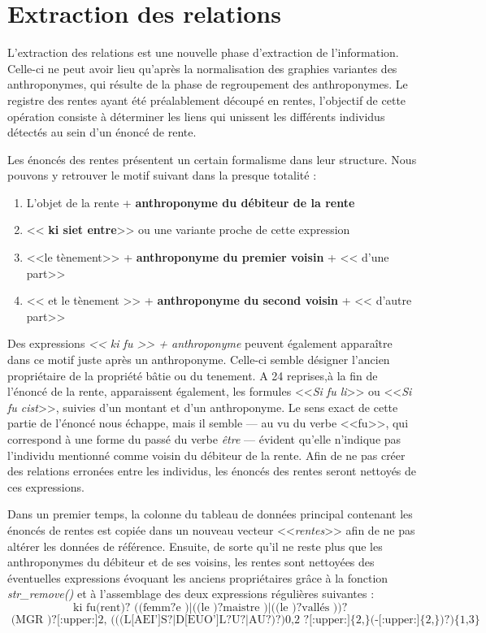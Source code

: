 \section{Extraction des relations}
L'extraction des relations est une nouvelle phase d'extraction de l'information. Celle-ci ne peut avoir lieu qu'après la normalisation des graphies variantes des anthroponymes, qui résulte de la phase de regroupement des anthroponymes.
Le registre des rentes ayant été préalablement découpé en rentes, l'objectif de cette opération consiste à déterminer les liens qui unissent les différents individus détectés au sein d'un énoncé de rente.

Les énoncés des rentes présentent un certain formalisme dans leur structure. Nous pouvons y retrouver le motif suivant dans la presque totalité : 
\begin{enumerate}
\item L'objet de la rente +  \textbf{anthroponyme du débiteur de la rente}
\item << \textbf{ki siet entre}>> ou une variante proche de cette expression
\item <<le tènement>> +  \textbf{anthroponyme du premier voisin } + << d'une part>> 
\item << et le tènement >> + \textbf{anthroponyme du second voisin} + << d'autre part>>
\end{enumerate}
Des expressions \textit{<< ki fu >> + anthroponyme} peuvent également apparaître dans ce motif juste après un anthroponyme. Celle-ci semble désigner l'ancien propriétaire de la propriété bâtie ou du tenement. A 24 reprises,à la fin de l'énoncé de la rente, apparaissent également,  les formules <<\textit{Si fu li}>> ou <<\textit{Si fu cist}>>, suivies d'un montant et d'un anthroponyme. Le sens exact de cette partie de l'énoncé nous échappe, mais il semble --- au vu du verbe <<fu>>,  qui correspond à une forme du passé du verbe \textit{être} --- évident qu'elle n'indique pas l'individu mentionné comme voisin du débiteur de la rente. Afin de ne pas créer des relations erronées entre les individus, les énoncés des rentes seront nettoyés de ces expressions.

Dans un premier temps, la colonne du tableau de données principal contenant les énoncés de rentes est copiée dans un nouveau vecteur <<\textit{rentes}>> afin de ne pas altérer les données de référence. Ensuite, de sorte qu'il ne reste plus que les anthroponymes du débiteur et de ses voisins, les rentes sont nettoyées des éventuelles expressions évoquant les anciens propriétaires grâce à la fonction \textit{str\_remove()} et à l'assemblage des deux expressions régulières suivantes : 
\[ \boxed{ 
    \text{ki fu(rent)? ((femm?e )|((le )?maistre )|((le )?vallés ))? }
    }
\]
\[ \boxed{ 
    \text{ 
        (MGR )?[:upper:]{2,} (((L[AEI']S?|D[EUO']L?U?|AU?)?){0,2} ?[:upper:]\{2,\}(-[:upper:]\{2,\})?)\{1,3\} }
    }
\]



